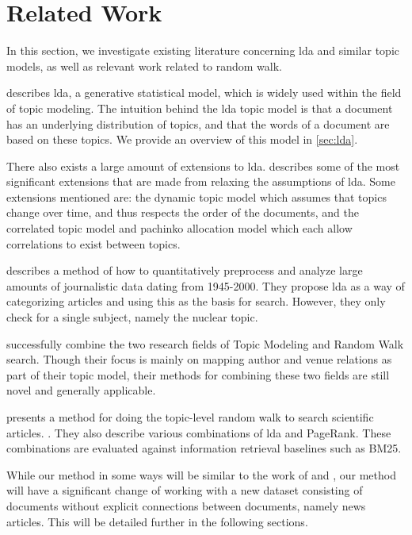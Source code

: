 \section{Related Work}\label{sec:related-works} 
In this section, we investigate existing literature concerning \gls{lda} and similar topic models, as well as relevant work related to random walk.

\citet{lda} describes \acrlong{lda}, a generative statistical model, which is widely used within the field of topic modeling. 
The intuition behind the \gls{lda} topic model is that a document has an underlying distribution of topics, and that the words of a document are based on these topics.
We provide an overview of this model in \autoref{sec:lda}.

There also exists a large amount of extensions to \gls{lda}.
\citet{blei2012topicmodels} describes some of the most significant extensions that are made from relaxing the assumptions of \gls{lda}.
Some extensions mentioned are: the dynamic topic model\cite{blei2006dynamic} which assumes that topics change over time, and thus respects the order of the documents, and the correlated topic model\cite{blei2007correlated} and pachinko allocation model\cite{li2006pachinko} which each allow correlations to exist between topics.


\citet{quanti} describes a method of how to quantitatively preprocess and analyze large amounts of journalistic data dating from 1945-2000. 
They propose \gls{lda} as a way of categorizing articles and using this as the basis for search.
However, they only check for a single subject, namely the nuclear topic.  


\citet{Tang2008} successfully combine the two research fields of Topic Modeling and Random Walk search. 
Though their focus is mainly on mapping author and venue relations as part of their topic model, their methods for combining these two fields are still novel and generally applicable.


\citet{yang2009topic} presents a method for doing the topic-level random walk to search scientific articles.
.
They also describe various combinations of \gls{lda} and PageRank.
These combinations are evaluated against information retrieval baselines such as BM25\cite{bm251996}.


While our method in some ways will be similar to the work of \citeauthor{Tang2008} and \citeauthor{yang2009topic}, our method will have a significant change of working with a new dataset consisting of documents without explicit connections between documents, namely news articles.
This will be detailed further in the following sections.

